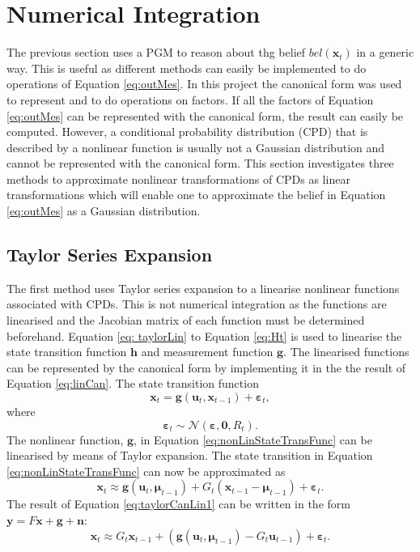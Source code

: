 \documentclass[12pt,oneside,openany,a4paper, %
afrikaans,english,
]{memoir}
\numberwithin{equation}{chapter}
\begin{document}
\section{Numerical Integration}
The previous section uses a PGM to reason about thg belief $bel(\bm{x}_t)$ in a generic way. This is useful as different methods can easily be implemented to do operations of Equation \ref{eq:outMes}. In this project the canonical form was used to represent and to do operations on factors. If all the factors of Equation \ref{eq:outMes} can be represented with the canonical form, the result can easily be computed. However, a conditional probability distribution (CPD) that is described by a nonlinear function is usually not a Gaussian distribution and cannot be represented with the canonical form. This section investigates three methods to approximate nonlinear transformations of CPDs as linear transformations which will enable one to approximate the belief in Equation \ref{eq:outMes} as a Gaussian distribution.

\subsection{Taylor Series Expansion}
The first method uses Taylor series expansion to a linearise nonlinear functions associated with CPDs. This is not numerical integration as the functions are linearised and the Jacobian matrix of each function must be determined beforehand.
Equation \ref{eq: taylorLin} to Equation \ref{eq:Ht} is used to linearise the state transition function $\bm{h}$ and measurement function $\bm{g}$.
The linearised functions can be represented by the canonical form by implementing it in the the result of Equation \ref{eq:linCan}. The state transition function
\begin{equation}\label{eq:nonLinStateTransFunc}
\bm{x}_t = \bm{g}(\bm{u}_t, \bm{x}_{t-1}) + \bm{\varepsilon}_t,
\end{equation}
where
\begin{equation}
\bm{\varepsilon}_t \sim \mathcal{N}(\bm{\varepsilon}, \bm{0}, R_t).
\end{equation}
The nonlinear function, $\bm{g}$, in Equation \ref{eq:nonLinStateTransFunc} can be linearised by means of Taylor expansion. The state transition in Equation \ref{eq:nonLinStateTransFunc} can now be approximated as
\begin{equation}\label{eq:taylorCanLin1}
\bm{x}_t \approx \bm{g}(\bm{u}_t, \bm{\mu}_{t-1}) + G_t(\bm{x}_{t-1} - 
\bm{\mu}_{t-1}) + \bm{\varepsilon}_t.
\end{equation}
The result of Equation \ref{eq:taylorCanLin1} can be written in the form $\bm{y} = F\bm{x} + \bm{g} + \bm{n}$:
\begin{equation}\label{eq:taylorCanLin2}
\bm{x}_t \approx G_t\bm{x}_{t-1} + (\bm{g}(\bm{u}_t, \bm{\mu}_{t-1}) - G_t\bm{u}_{t-1}) + \bm{\varepsilon}_t.
\end{equation}
\end{document}
